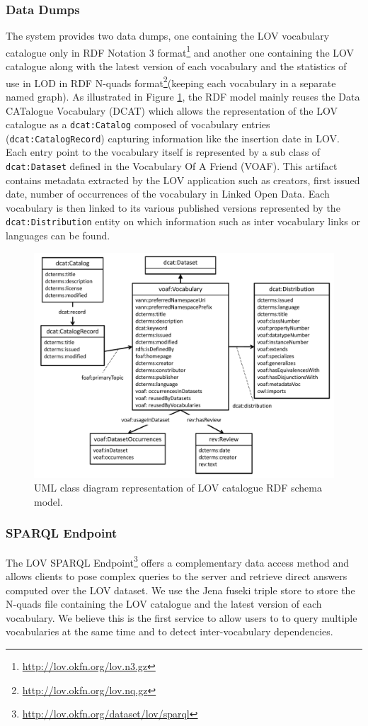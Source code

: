 \documentclass{iosart2c}
\begin{document}
\subsubsection{Data Dumps}
The system provides two data dumps, one containing the LOV vocabulary catalogue only in RDF Notation 3 format\footnote{\url{http://lov.okfn.org/lov.n3.gz}} and another one containing the LOV catalogue along with the latest version of each vocabulary and the statistics of use in LOD in RDF N-quads format\footnote{\url{http://lov.okfn.org/lov.nq.gz}}(keeping each vocabulary in a separate named graph). As illustrated in Figure \ref{fig:model}, the RDF model mainly reuses the Data CATalogue Vocabulary (DCAT) which allows the representation of the LOV catalogue as a \texttt{dcat:Catalog} composed of vocabulary entries (\texttt{dcat:CatalogRecord}) capturing information like the insertion date in LOV. Each entry point to the vocabulary itself is represented by a sub class of \texttt{dcat:Dataset} defined in the Vocabulary Of A Friend (VOAF). This artifact contains metadata extracted by the LOV application such as creators, first issued date, number of occurrences of the vocabulary in Linked Open Data. Each vocabulary is then linked to its various published versions represented by the \texttt{dcat:Distribution} entity on which information such as inter vocabulary links or languages can be found.

\begin{figure}[!htb]
\includegraphics[width=.9\textwidth]{LOV_model.pdf}
\caption{UML class diagram representation of LOV catalogue RDF schema model.}
\label{fig:model}
\end{figure}


\subsubsection{SPARQL Endpoint}
The LOV SPARQL Endpoint\footnote{\url{http://lov.okfn.org/dataset/lov/sparql}} offers a complementary data access method and allows clients to pose complex queries to the server and retrieve direct answers computed over the LOV dataset. We use the Jena fuseki triple store to store the N-quads file containing the LOV catalogue and the latest version of each vocabulary. We believe this is the first service to allow users to to query multiple vocabularies at the same time and to detect inter-vocabulary dependencies. 
\end{document}
